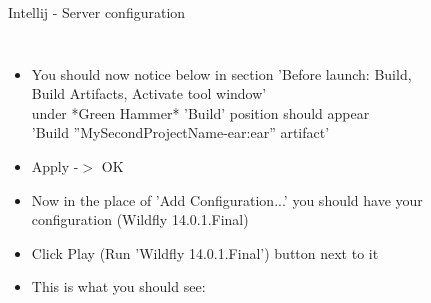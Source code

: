 \documentclass[aspectratio=1610,english]{beamer} %
\begin{document}
\begin{frame}{Intellij - Server configuration}
\begin{columns}
				\begin{minipage}{\textwidth}
				\end{minipage}
				\begin{itemize}
					\color{black}
					\tiny
					\item You should now notice below in section 'Before launch: Build, \\ 
						Build Artifacts, Activate tool window' \\
						under *Green Hammer* 'Build' position should appear \\
						'Build ''MySecondProjectName-ear:ear'' artifact' 
					\item Apply -$>$ OK
					\item Now in the place of 'Add Configuration...' you should have your \\ 
						configuration (Wildfly 14.0.1.Final)
					\item Click Play (Run 'Wildfly 14.0.1.Final') button next to it
					\item This is what you should see:
				\end{itemize}
				
				\begin{minipage}{\textwidth}
				\end{minipage}
		\end{columns}
	\end{frame}
\end{document}
